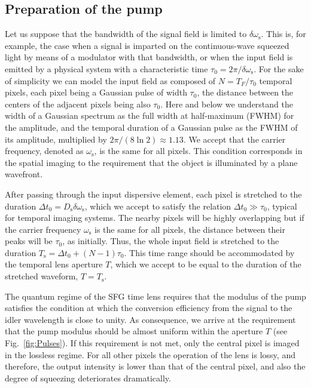 \documentclass[10pt,twocolumn]{article}
\begin{document}
\subsection{Preparation of the pump}
Let us suppose that the bandwidth of the signal field is limited to $\delta\omega_{\mathrm{s}}$. This is, for example, the case when a signal is imparted on the continuous-wave squeezed light by means of a modulator with that bandwidth, or when the input field is emitted by a physical system with a characteristic time $\tau_0=2\pi/\delta\omega_{\mathrm{s}}$. For the sake of simplicity we can model the input field as composed of $N=T_{F}/\tau_0$ temporal pixels, each pixel being a Gaussian pulse of width $\tau_0$, the distance between the centers of the adjacent pixels being also $\tau_0$. Here and below we understand the width of a Gaussian spectrum as the full width at half-maximum (FWHM) for the amplitude, and the temporal duration of a Gaussian pulse as the FWHM of its amplitude, multiplied by $2\pi/(8\ln 2)\approx 1.13$. We accept that the carrier frequency, denoted as $\omega_{\mathrm{s}}$, is the same for all pixels. This condition corresponds in the spatial imaging to the requirement that the object is illuminated by a plane wavefront.

After passing through the input dispersive element, each pixel is stretched to the duration $\Delta t_0=D_{\mathrm{s}}\delta\omega_{\mathrm{s}}$, which we accept to satisfy the relation $\Delta t_0\gg \tau_0$, typical for temporal imaging systems. The nearby pixels will be highly overlapping but if the carrier frequency $\omega_{\mathrm{s}}$ is the same for all pixels, the distance between their peaks will be $\tau_0$, as initially. Thus, the whole input field is stretched to the duration $T_{\mathrm{s}} = \Delta t_0+(N-1)\tau_0$. This time range should be accommodated by the temporal lens aperture $T$, which we accept to be equal to the duration of the stretched waveform, $T=T_{\mathrm{s}}$.

The quantum regime of the SFG time lens requires that the modulus of the pump satisfies the condition at which the conversion efficiency from the signal to the idler wavelength is close to unity. As consequence, we arrive at the requirement that the pump modulus should be almost uniform within the aperture $T$ (see Fig.~\ref{fig:Pulses}). If this requirement is not met, only the central pixel is imaged in the lossless regime. For all other pixels the operation of the lens is lossy, and therefore, the output intensity is lower than that of the central pixel, and also the degree of squeezing deteriorates dramatically.
\end{document}

